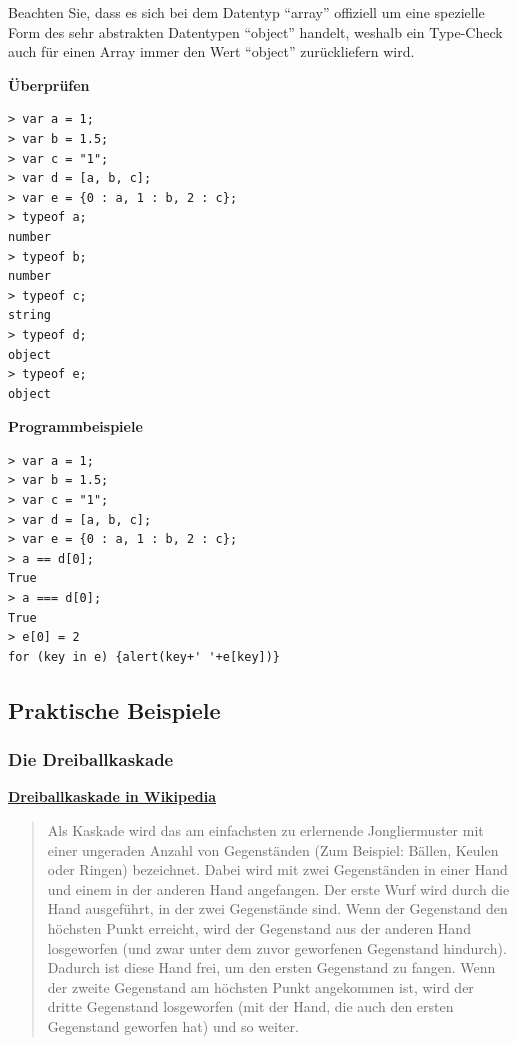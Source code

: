 {Beachten Sie, dass es sich bei dem Datentyp ``array'' offiziell um eine
spezielle Form des sehr abstrakten Datentypen ``object'' handelt,
weshalb ein Type-Check auch für einen Array immer den Wert ``object''
zurückliefern wird.}



\vspace{0.5cm}\par\noindent\textbf{Überprüfen}\vspace{0.5cm}

\begin{verbatim}
> var a = 1;
> var b = 1.5;
> var c = "1";
> var d = [a, b, c];
> var e = {0 : a, 1 : b, 2 : c};
> typeof a;
number
> typeof b;
number
> typeof c;
string
> typeof d;
object
> typeof e;
object
\end{verbatim}



\vspace{0.5cm}\par\noindent\textbf{Programmbeispiele}\vspace{0.5cm}

\begin{verbatim}
> var a = 1;
> var b = 1.5;
> var c = "1";
> var d = [a, b, c];
> var e = {0 : a, 1 : b, 2 : c};
> a == d[0];
True
> a === d[0];
True
> e[0] = 2
for (key in e) {alert(key+' '+e[key])}
\end{verbatim}

\subsection{\texorpdfstring{{Praktische
Beispiele}}{Praktische Beispiele}}

\subsubsection{\texorpdfstring{{Die
Dreiballkaskade}}{Die Dreiballkaskade}}

\vspace{0.5cm}\par\noindent\textbf{\href{http://de.wikipedia.org/wiki/Kaskade_(Jonglieren)}{Dreiballkaskade\vspace{0.5cm}
in Wikipedia}}

\begin{quote}
Als Kaskade wird das am einfachsten zu erlernende Jongliermuster mit
einer ungeraden Anzahl von Gegenständen (Zum Beispiel: Bällen, Keulen
oder Ringen) bezeichnet. Dabei wird mit zwei Gegenständen in einer Hand
und einem in der anderen Hand angefangen. Der erste Wurf wird durch die
Hand ausgeführt, in der zwei Gegenstände sind. Wenn der Gegenstand den
höchsten Punkt erreicht, wird der Gegenstand aus der anderen Hand
losgeworfen (und zwar unter dem zuvor geworfenen Gegenstand hindurch).
Dadurch ist diese Hand frei, um den ersten Gegenstand zu fangen. Wenn
der zweite Gegenstand am höchsten Punkt angekommen ist, wird der dritte
Gegenstand losgeworfen (mit der Hand, die auch den ersten Gegenstand
geworfen hat) und so weiter.
\end{quote}



